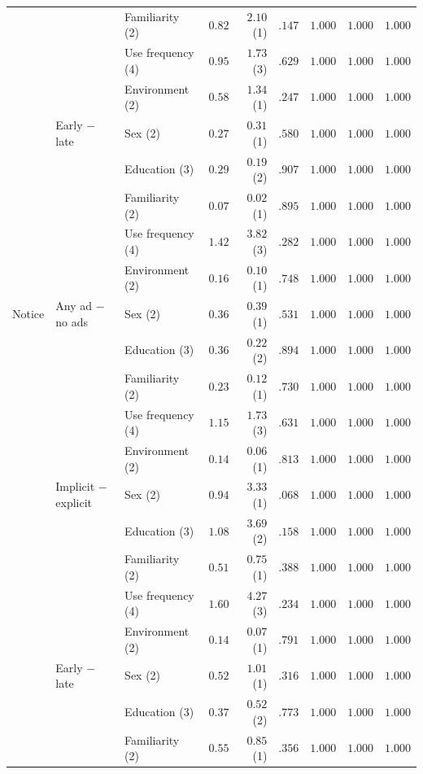 \begin{table}[H]
\begin{tabular}{@{}ll l r r r r r r@{}}
 &  & Familiarity (2) & $0.82$ & $2.10$ (1) & $.147$ & $1.000$ & $1.000$ & $1.000$ \\
 &  & Use frequency (4) & $0.95$ & $1.73$ (3) & $.629$ & $1.000$ & $1.000$ & $1.000$ \\
 &  & Environment (2) & $0.58$ & $1.34$ (1) & $.247$ & $1.000$ & $1.000$ & $1.000$ \\
 & Early \(-\) late & Sex (2) & $0.27$ & $0.31$ (1) & $.580$ & $1.000$ & $1.000$ & $1.000$ \\
 &  & Education (3) & $0.29$ & $0.19$ (2) & $.907$ & $1.000$ & $1.000$ & $1.000$ \\
 &  & Familiarity (2) & $0.07$ & $0.02$ (1) & $.895$ & $1.000$ & $1.000$ & $1.000$ \\
 &  & Use frequency (4) & $1.42$ & $3.82$ (3) & $.282$ & $1.000$ & $1.000$ & $1.000$ \\
 &  & Environment (2) & $0.16$ & $0.10$ (1) & $.748$ & $1.000$ & $1.000$ & $1.000$ \\
\midrule
Notice & Any ad \(-\) no ads & Sex (2) & $0.36$ & $0.39$ (1) & $.531$ & $1.000$ & $1.000$ & $1.000$ \\
 &  & Education (3) & $0.36$ & $0.22$ (2) & $.894$ & $1.000$ & $1.000$ & $1.000$ \\
 &  & Familiarity (2) & $0.23$ & $0.12$ (1) & $.730$ & $1.000$ & $1.000$ & $1.000$ \\
 &  & Use frequency (4) & $1.15$ & $1.73$ (3) & $.631$ & $1.000$ & $1.000$ & $1.000$ \\
 &  & Environment (2) & $0.14$ & $0.06$ (1) & $.813$ & $1.000$ & $1.000$ & $1.000$ \\
 & Implicit \(-\) explicit & Sex (2) & $0.94$ & $3.33$ (1) & $.068$ & $1.000$ & $1.000$ & $1.000$ \\
 &  & Education (3) & $1.08$ & $3.69$ (2) & $.158$ & $1.000$ & $1.000$ & $1.000$ \\
 &  & Familiarity (2) & $0.51$ & $0.75$ (1) & $.388$ & $1.000$ & $1.000$ & $1.000$ \\
 &  & Use frequency (4) & $1.60$ & $4.27$ (3) & $.234$ & $1.000$ & $1.000$ & $1.000$ \\
 &  & Environment (2) & $0.14$ & $0.07$ (1) & $.791$ & $1.000$ & $1.000$ & $1.000$ \\
 & Early \(-\) late & Sex (2) & $0.52$ & $1.01$ (1) & $.316$ & $1.000$ & $1.000$ & $1.000$ \\
 &  & Education (3) & $0.37$ & $0.52$ (2) & $.773$ & $1.000$ & $1.000$ & $1.000$ \\
 &  & Familiarity (2) & $0.55$ & $0.85$ (1) & $.356$ & $1.000$ & $1.000$ & $1.000$ \\

\end{tabular}
\end{table}
